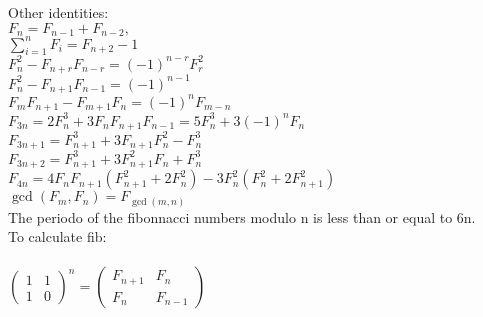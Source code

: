 \documentclass[10pt,letterpaper,twocolumn,twosided]{article}
\begin{document}
Other identities:\\


$F_{n} = F_{n-1} + F_{n-2},$\\

$\sum_{i=1}^n F_i = F_{n+2} - 1$\\

$F_n^2 - F_{n+r}F_{n-r} = (-1)^{n-r}F_r^2$\\

$F_n^2 - F_{n+1}F_{n-1} = (-1)^{n-1}$\\

$F_m F_{n+1} - F_{m+1} F_n = (-1)^n F_{m-n}$\\

$F_{3n} = 2F_n^3 + 3F_n F_{n+1} F_{n-1} = 5F_n^3 + 3 (-1)^n F_n \,$\\

$F_{3n+1} = F_{n+1}^3 + 3 F_{n+1}F_n^2 - F_n^3 \,$\\

$F_{3n+2} = F_{n+1}^3 + 3 F_{n+1}^2F_n + F_n^3 \,$\\

$F_{4n} = 4F_nF_{n+1}(F_{n+1}^2 + 2F_n^2) - 3F_n^2(F_n^2 + 2F_{n+1}^2) \,$\\

$\gcd(F_m,F_n) = F_{\gcd(m,n)}\,$\\

The periodo of the fibonnacci numbers modulo n is less than or equal to 6n.\\

To calculate fib:\\\\

${\begin{pmatrix} 1 & 1 \\ 1 & 0 \end{pmatrix}}^{n} = \begin{pmatrix} F_{n+1} & F_{n} \\ F_{n} & F_{n-1} \end{pmatrix}$
\end{document}

